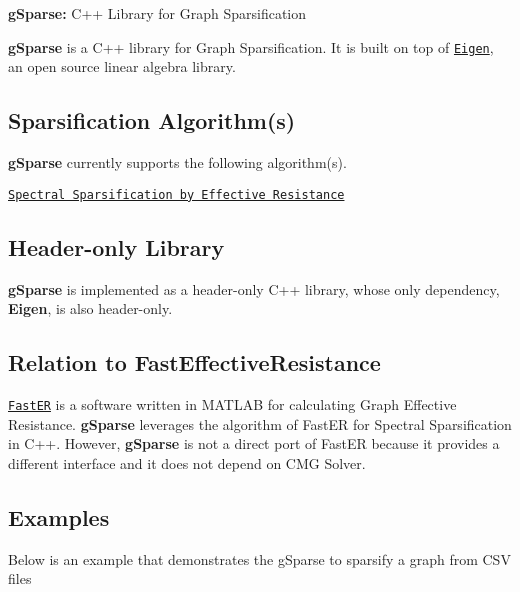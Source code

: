 {\bfseries g\+Sparse\+:} C++ Library for Graph Sparsification

{\bfseries g\+Sparse} is a C++ library for Graph Sparsification. It is built on top of \href{http://eigen.tuxfamily.org}{\tt Eigen}, an open source linear algebra library.

\subsection*{Sparsification Algorithm(s)}

{\bfseries g\+Sparse} currently supports the following algorithm(s).
\begin{DoxyItemize}
\item \href{https://arxiv.org/abs/0803.0929}{\tt Spectral Sparsification by Effective Resistance}
\end{DoxyItemize}

\subsection*{Header-\/only Library}

{\bfseries g\+Sparse} is implemented as a header-\/only C++ library, whose only dependency, {\bfseries Eigen}, is also header-\/only.

\subsection*{Relation to Fast\+Effective\+Resistance}

\href{http://www.cs.cmu.edu/~jkoutis/SpectralAlgorithms.htm}{\tt Fast\+ER} is a software written in M\+A\+T\+L\+AB for calculating Graph Effective Resistance. {\bfseries g\+Sparse} leverages the algorithm of Fast\+ER for Spectral Sparsification in C++. However, {\bfseries g\+Sparse} is not a direct port of Fast\+ER because it provides a different interface and it does not depend on C\+MG Solver.

\subsection*{Examples}

Below is an example that demonstrates the g\+Sparse to sparsify a graph from C\+SV files


